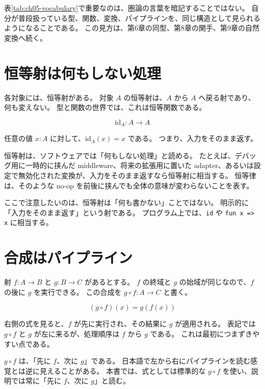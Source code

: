 表\ref{tab:ch05-vocabulary}で重要なのは、圏論の言葉を暗記することではない。
自分が普段扱っている型、関数、変換、パイプラインを、同じ構造として見られるようになることである。
この見方は、第6章の同型、第8章の関手、第9章の自然変換へ続く。

\section{恒等射は何もしない処理}

各対象には、恒等射がある。
対象 \(A\) の恒等射は、\(A\) から \(A\) へ戻る射であり、何も変えない。
型と関数の世界では、これは恒等関数である。

\[
  \mathrm{id}_A : A \to A
\]

任意の値 \(x : A\) に対して、\(\mathrm{id}_A(x) = x\) である。
つまり、入力をそのまま返す。

\begin{softwarebox}
恒等射は、ソフトウェアでは「何もしない処理」と読める。
たとえば、デバッグ用に一時的に挟んだ middleware、将来の拡張用に置いた adapter、あるいは設定で無効化された変換が、入力をそのまま返すなら恒等射に相当する。
恒等律は、そのような no-op を前後に挟んでも全体の意味が変わらないことを表す。
\end{softwarebox}

ここで注意したいのは、恒等射は「何も書かない」ことではない。
明示的に「入力をそのまま返す」という射である。
プログラム上では、\texttt{id} や \texttt{fun x => x} に相当する。

\section{合成はパイプライン}

射 \(f : A \to B\) と \(g : B \to C\) があるとする。
\(f\) の終域と \(g\) の始域が同じなので、\(f\) の後に \(g\) を実行できる。
この合成を \(g \circ f : A \to C\) と書く。

\[
  (g \circ f)(x) = g(f(x))
\]

右側の式を見ると、\(f\) が先に実行され、その結果に \(g\) が適用される。
表記では \(g \circ f\) と \(g\) が左に来るが、処理順序は \(f\) から \(g\) である。
これは最初につまずきやすい点である。

\begin{warningbox}
\(g \circ f\) は、「先に \(f\)、次に \(g\)」である。
日本語で左から右にパイプラインを読む感覚とは逆に見えることがある。
本書では、式としては標準的な \(g \circ f\) を使い、説明では常に「先に \(f\)、次に \(g\)」と読む。
\end{warningbox}

